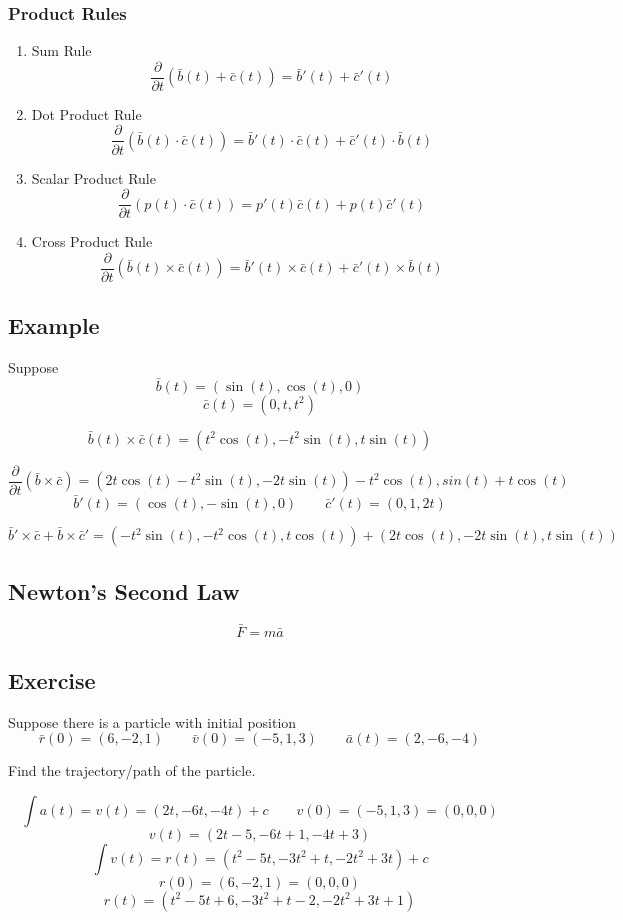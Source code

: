 \documentclass{article}
\begin{document}
\subsubsection*{Product Rules}
\begin{enumerate}
    \item Sum Rule
        \[\frac{\partial}{\partial t}(\bar{b}(t)+\bar{c}(t))=\bar{b}\prime(t)+\bar{c}\prime(t)\]
    \item Dot Product Rule
        \[\frac{\partial}{\partial t}(\bar{b}(t)\cdot\bar{c}(t))=\bar{b}\prime(t)\cdot\bar{c}(t)+\bar{c}\prime(t)\cdot\bar{b}(t)\]
    \item Scalar Product Rule
        \[\frac{\partial}{\partial t}(p(t)\cdot\bar{c}(t))=p\prime(t)\bar{c}(t)+p(t)\bar{c}\prime(t)\]
    \item Cross Product Rule
        \[\frac{\partial}{\partial t}(\bar{b}(t)\times\bar{c}(t))=\bar{b}\prime(t)\times\bar{c}(t)+\bar{c}\prime(t)\times\bar{b}(t)\]
\end{enumerate}

\subsection*{Example}
Suppose 
\[\bar{b}(t)=(\sin(t),\cos(t),0)\]
\[\bar{c}(t)=(0,t,t^2)\]

\[\bar{b}(t)\times\bar{c}(t)=(t^2\cos(t),-t^2\sin(t),t\sin(t))\]

\[\frac{\partial}{\partial t}(\bar{b}\times\bar{c})=(2t\cos(t)-t^{2}\sin(t),-2t\sin(t))-t^2\cos(t),sin(t)+t\cos(t)\]
\[\bar{b}\prime(t) = (\cos(t),-\sin(t),0)\qquad \bar{c}\prime(t)=(0,1,2t)\]

\[\bar{b}\prime\times\bar{c}+\bar{b}\times\bar{c}\prime=(-t^2\sin(t),-t^2\cos(t), t\cos(t))+(2t\cos(t),-2t\sin(t),t\sin(t))\]

\subsection*{Newton's Second Law}
\[\bar{F}=m\bar{a}\]

\subsection*{Exercise}
Suppose there is a particle with initial position
\[\bar{r}(0)=(6,-2,1)\qquad \bar{v}(0)=(-5,1,3)\qquad\bar{a}(t)=(2,-6,-4)\]

Find the trajectory/path of the particle.

\[\int a(t)=v(t) = (2t,-6t,-4t)+c\qquad v(0)=(-5,1,3)=(0,0,0)\]
\[v(t)=(2t-5,-6t+1,-4t+3)\]
\[\int v(t)=r(t)=(t^2-5t,-3t^2+t,-2t^2+3t)+c\]
\[r(0)=(6,-2,1)=(0,0,0)\]
\[r(t)=(t^2-5t+6,-3t^2+t-2,-2t^2+3t+1)\]
\end{document}
